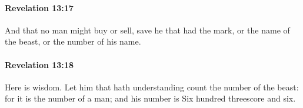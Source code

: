 		\paragraph{Revelation 13:17} %
			\label{REVELATIONNT-13-17}

			And that no man might buy or sell, save he that had the mark, or the name of the beast, or the number of his name.

			\begin{framed}
			\scriptsize
				\begin{compactdesc}
					\item[SBLG] 
				\end{compactdesc}
			\end{framed}

		\paragraph{Revelation 13:18} %
			\label{REVELATIONNT-13-18}

			Here is wisdom. Let him that hath understanding count the number of the beast: for it is the number of a man; and his number is Six hundred threescore and six.

